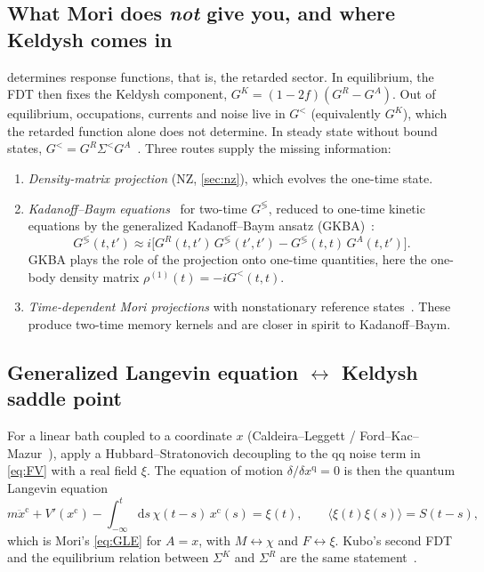 \documentclass[11pt]{article}
\newcommand{\dd}{\mathrm{d}}
\newcommand{\cl}{\mathrm{c}}
\newcommand{\qu}{\mathrm{q}}
\newcommand{\avg}[1]{\langle#1\rangle}
\begin{document}
\subsection{What Mori does \texorpdfstring{\emph{not}}{not} give you, and where Keldysh comes in}
 determines response functions, that is, the retarded sector. In
equilibrium, the FDT then fixes the Keldysh component,
$G^K=(1-2f)(G^R-G^A)$. Out of equilibrium, occupations, currents and noise live in
$G^{<}$ (equivalently $G^K$), which the retarded function alone does not determine. In
steady state without bound states, $G^<=G^R\Sigma^<G^A$~\cite{JauhoWingreenMeir1994,RammerSmith1986}.
Three routes supply the missing information:
\begin{enumerate}\itemsep0pt
\item \emph{Density-matrix projection} (NZ, \cref{sec:nz}), which evolves the one-time state.
\item \emph{Kadanoff--Baym equations}~\cite{KadanoffBaym,StefanucciVanLeeuwen} for two-time
  $G^{\lessgtr}$, reduced to one-time kinetic equations by the generalized Kadanoff--Baym
  ansatz (GKBA)~\cite{Lipavsky1986}:
  \begin{equation}
    G^{\lessgtr}(t,t')\approx i\big[G^R(t,t')\,G^{\lessgtr}(t',t')-G^{\lessgtr}(t,t)\,G^A(t,t')\big].
  \end{equation}
  GKBA plays the role of the projection onto one-time quantities, here the one-body
  density matrix $\rho^{(1)}(t)=-iG^<(t,t)$.
\item \emph{Time-dependent Mori projections} with nonstationary reference
  states~\cite{Grabert1982}. These produce two-time memory kernels and are closer in
  spirit to Kadanoff--Baym.
\end{enumerate}

\subsection{Generalized Langevin equation \texorpdfstring{$\leftrightarrow$}{<->} Keldysh saddle point}
For a linear bath coupled to a coordinate $x$ (Caldeira--Leggett /
Ford--Kac--Mazur~\cite{CaldeiraLeggett1983,FordKacMazur1965}), apply a
Hubbard--Stratonovich decoupling to the $\qu\qu$ noise term in \cref{eq:FV} with a real
field $\xi$. The equation of motion $\delta/\delta x^\qu=0$ is then the quantum Langevin
equation
\begin{equation}
  m\ddot x^\cl+V'(x^\cl)-\int_{-\infty}^{t}\!\dd s\,\chi(t-s)\,x^\cl(s)=\xi(t),\qquad
  \avg{\xi(t)\xi(s)}=S(t-s),
\end{equation}
which is Mori's \cref{eq:GLE} for $A=x$, with $M\leftrightarrow\chi$ and $F\leftrightarrow\xi$.
Kubo's second FDT and the equilibrium relation between $\Sigma^K$ and $\Sigma^R$ are the same
statement~\cite{Kamenev2011,Weiss2012}.
\end{document}
